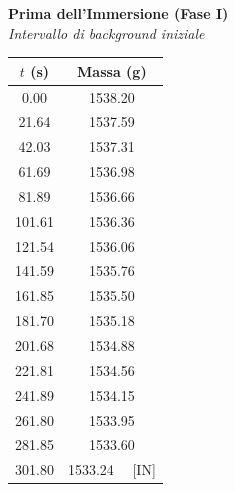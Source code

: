 \documentclass[a4paper,12pt]{article}
\begin{document}
\noindent
\begin{minipage}[t]{0.38\textwidth}
    \centering
    \textbf{Prima dell'Immersione (Fase I)} \\
    \textit{Intervallo di background iniziale} \\
    \vspace{0.3cm}
    \begin{tabular}{cc}
        \hline
        $t$ (s) & Massa (g) \\ \hline
        0.00 & 1538.20 \\
        21.64 & 1537.59 \\
        42.03 & 1537.31 \\
        61.69 & 1536.98 \\
        81.89 & 1536.66 \\
        101.61 & 1536.36 \\
        121.54 & 1536.06 \\
        141.59 & 1535.76 \\
        161.85 & 1535.50 \\
        181.70 & 1535.18 \\
        201.68 & 1534.88 \\
        221.81 & 1534.56 \\
        241.89 & 1534.15 \\
        261.80 & 1533.95 \\
        281.85 & 1533.60 \\
        301.80 & 1533.24 \ \ [IN] \\ \hline
    \end{tabular}
\end{minipage}
\hfill
\end{document}
